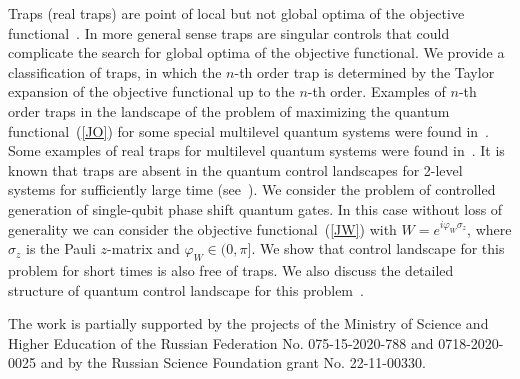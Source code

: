 \documentclass[12pt]{llncs}
\begin{document}
Traps (real traps) are  point of local but not global optima of the objective functional~\cite{Rabitz2004,PechenTannor2011}. In more general sense traps are singular controls  that  could complicate the search for global optima of the objective functional. We provide a classification of traps, in which the $n$-th order trap is determined by the Taylor expansion of the objective functional up to the $n$-th order.  Examples of $n$-th order  traps in the landscape of the problem of maximizing the quantum functional~(\ref{JO}) for some special multilevel quantum systems were found in~\cite{PechenTannor2011,PechenTannor2012}. Some examples of real traps for multilevel quantum systems were found in~\cite{deFouquieresSchirmer}.
It is known that traps are absent in the quantum control landscapes for 2-level systems for sufficiently large time (see~\cite{PechenIl'in2014,PechenIl'in2016}).
We consider the problem of  controlled generation of single-qubit phase shift quantum gates. In this case  without loss of generality we can consider the objective functional~(\ref{JW}) with  $W=e^{i\varphi_W\sigma_z}$, where  $\sigma_z$ is  the Pauli $z$-matrix and $\varphi_W\in(0,\pi]$.  We show that control landscape for this problem for short times is also free of traps. We also discuss the detailed structure of quantum control landscape for this problem~\cite{VolkovMorzhinPechen,VolkovPechen}. 

The work is partially supported by the projects of the Ministry of Science and Higher Education of the Russian Federation No. 075-15-2020-788 and 0718-2020-0025 and by the Russian Science Foundation grant No. 22-11-00330.
\end{document}
